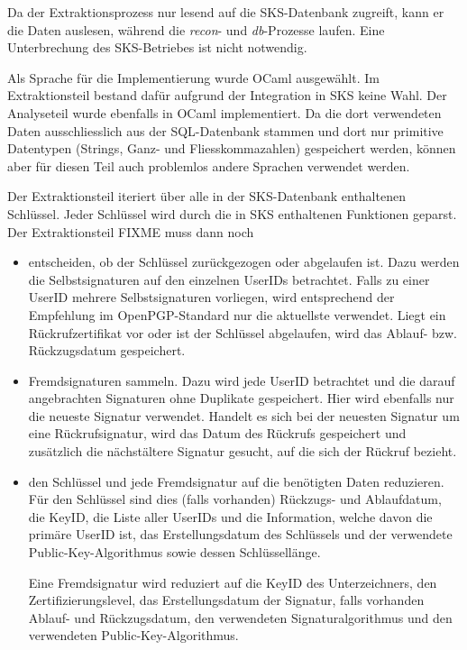 Da der Extraktionsprozess nur lesend auf die SKS-Datenbank zugreift,
kann er die Daten auslesen, während die \emph{recon}- und
\emph{db}-Prozesse laufen. Eine Unterbrechung des SKS-Betriebes ist
nicht notwendig.

Als Sprache für die Implementierung wurde OCaml ausgewählt. Im
Extraktionsteil bestand dafür aufgrund der Integration in SKS keine
Wahl. Der Analyseteil wurde ebenfalls in OCaml implementiert. Da die
dort verwendeten Daten ausschliesslich aus der SQL-Datenbank stammen
und dort nur primitive Datentypen (Strings, Ganz- und
Fliesskommazahlen) gespeichert werden, können aber für diesen Teil
auch problemlos andere Sprachen verwendet werden.

Der Extraktionsteil iteriert über alle in der SKS-Datenbank
enthaltenen Schlüssel. Jeder Schlüssel wird durch die in SKS
enthaltenen Funktionen geparst. Der Extraktionsteil FIXME muss dann
noch
\begin{itemize}
\item entscheiden, ob der Schlüssel zurückgezogen oder abgelaufen
  ist. Dazu werden die Selbstsignaturen auf den einzelnen UserIDs
  betrachtet. Falls zu einer UserID mehrere Selbstsignaturen
  vorliegen, wird entsprechend der Empfehlung im OpenPGP-Standard nur
  die aktuellste verwendet. Liegt ein Rückrufzertifikat vor oder ist
  der Schlüssel abgelaufen, wird das Ablauf- bzw. Rückzugsdatum
  gespeichert.
\item Fremdsignaturen sammeln. Dazu wird jede UserID betrachtet und
  die darauf angebrachten Signaturen ohne Duplikate gespeichert. Hier
  wird ebenfalls nur die neueste Signatur verwendet. Handelt es sich
  bei der neuesten Signatur um eine Rückrufsignatur, wird das Datum
  des Rückrufs gespeichert und zusätzlich die nächstältere Signatur
  gesucht, auf die sich der Rückruf bezieht.
\item den Schlüssel und jede Fremdsignatur auf die benötigten Daten
  reduzieren. Für den Schlüssel sind dies (falls vorhanden) Rückzugs-
  und Ablaufdatum, die KeyID, die Liste aller UserIDs und die
  Information, welche davon die primäre UserID ist, das
  Erstellungsdatum des Schlüssels und der verwendete
  Public-Key-Algorithmus sowie dessen Schlüssellänge.

  Eine Fremdsignatur wird reduziert auf die KeyID des Unterzeichners, 
  den Zertifizierungslevel, das Erstellungsdatum der Signatur,
  falls vorhanden Ablauf- und Rückzugsdatum, den verwendeten
  Signaturalgorithmus und den verwendeten Public-Key-Algorithmus.
\end{itemize}

